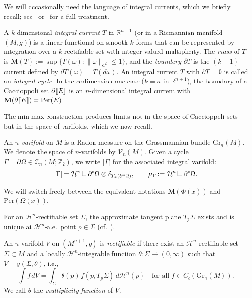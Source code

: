 We will occasionally need the language of integral currents, which we briefly recall; see~\cite[\S26--27]{Sim83} or~\cite[Chapter~4]{Fed69} for a full treatment.

\begin{definition}\label{def:p2-integral-current}
A $k$-dimensional \emph{integral current} $T$ in $\mathbb{R}^{n+1}$ (or in a Riemannian manifold $(M,g)$) is a linear functional on smooth $k$-forms that can be represented by integration over a $k$-rectifiable set with integer-valued multiplicity.
The \emph{mass} of $T$ is $\mathbf{M}(T) := \sup\{T(\omega) : \|\omega\|_{C^0} \leq 1\}$, and the \emph{boundary} $\partial T$ is the $(k-1)$-current defined by $\partial T(\omega) = T(d\omega)$.
An integral current $T$ with $\partial T = 0$ is called an \emph{integral cycle}.
In the codimension-one case ($k = n$ in $\mathbb{R}^{n+1}$), the boundary of a Caccioppoli set $\partial\llbracket E \rrbracket$ is an $n$-dimensional integral current with $\mathbf{M}(\partial\llbracket E \rrbracket) = \mathrm{Per}(E)$.
\end{definition}

The min-max construction produces limits not in the space of Caccioppoli sets but in the space of varifolds, which we now recall.

\begin{definition}\label{def:p2-varifold}
An \emph{$n$-varifold} on $M$ is a Radon measure on the Grassmannian bundle $\mathrm{Gr}_n(M)$. We denote the space of $n$-varifolds by $\mathcal{V}_n(M)$. Given a cycle $\Gamma = \partial \Omega \in \mathcal{Z}_n(M; \mathbb{Z}_2)$, we write $|\Gamma|$ for the associated integral varifold:
\[
|\Gamma| = \mathcal{H}^n \mres \partial^* \Omega \otimes \delta_{T_x(\partial^* \Omega)}, \qquad \mu_\Gamma := \mathcal{H}^n \mres \partial^* \Omega.
\]
\end{definition}

We will switch freely between the equivalent notations $\mathbf{M}(\Phi(x))$ and $\mathrm{Per}(\Omega(x))$.

For an $\mathcal{H}^n$-rectifiable set $\Sigma$, the approximate tangent plane $T_p\Sigma$ exists and is unique at $\mathcal{H}^n$-a.e.\ point $p \in \Sigma$ (cf.~\cite[Theorem~11.8]{Sim84}).

\begin{definition}\label{def:rectifiable-varifold}
An $n$-varifold $V$ on $(M^{n+1}, g)$ is \emph{rectifiable} if there exist an $\mathcal{H}^n$-rectifiable set $\Sigma \subset M$ and a locally $\mathcal{H}^n$-integrable function $\theta \colon \Sigma \to (0, \infty)$ such that $V = \underline{v}(\Sigma, \theta)$, i.e.,
\[
\int f \, dV = \int_\Sigma \theta(p) \, f(p, T_p\Sigma) \, d\mathcal{H}^n(p) \quad \text{for all } f \in C_c(\mathrm{Gr}_n(M)).
\]
We call $\theta$ the \emph{multiplicity function} of $V$.
\end{definition}

